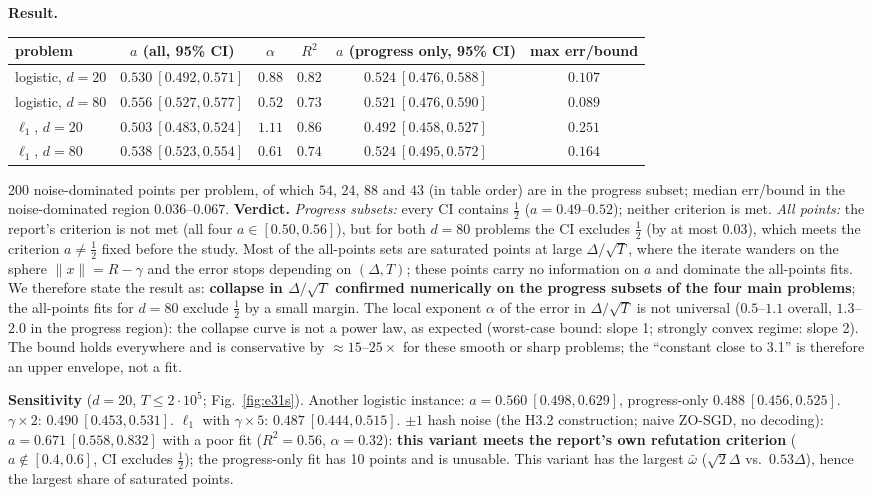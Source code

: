 \documentclass[11pt,a4paper]{article}
\numberwithin{equation}{section}
\theoremstyle{definition}
\theoremstyle{remark}
\newcommand{\norm}[1]{\lVert #1\rVert}\newcommand{\abs}[1]{\lvert #1\rvert}\newcommand{\ip}[2]{\langle #1,#2\rangle}
\newcommand{\wbar}{\bar\omega}\newcommand{\Atwo}{\cA^{\rm 2pt}_\gamma}
\begin{document}
\textbf{Result.}
\begin{center}\small
\begin{tabular}{@{}lccccc@{}}
\toprule
problem & $a$ (all, 95\% CI) & $\alpha$ & $R^2$ & $a$ (progress only, 95\% CI) & max err/bound\\
\midrule
logistic, $d=20$ & $0.530\ [0.492,0.571]$ & $0.88$ & $0.82$ & $0.524\ [0.476,0.588]$ & $0.107$\\
logistic, $d=80$ & $0.556\ [0.527,0.577]$ & $0.52$ & $0.73$ & $0.521\ [0.476,0.590]$ & $0.089$\\
$\ell_1$, $d=20$ & $0.503\ [0.483,0.524]$ & $1.11$ & $0.86$ & $0.492\ [0.458,0.527]$ & $0.251$\\
$\ell_1$, $d=80$ & $0.538\ [0.523,0.554]$ & $0.61$ & $0.74$ & $0.524\ [0.495,0.572]$ & $0.164$\\
\bottomrule
\end{tabular}
\end{center}
200 noise-dominated points per problem, of which $54$, $24$, $88$ and $43$ (in table order) are in the progress subset; median err/bound in the noise-dominated region $0.036$--$0.067$. \textbf{Verdict.} \emph{Progress subsets:} every CI contains $\frac12$ ($a=0.49$--$0.52$); neither criterion is met. \emph{All points:} the report's criterion is not met (all four $a\in[0.50,0.56]$), but for both $d=80$ problems the CI excludes $\frac12$ (by at most $0.03$), which meets the criterion $a\ne\frac12$ fixed before the study. Most of the all-points sets are saturated points at large $\Delta/\sqrt T$, where the iterate wanders on the sphere $\norm x=R-\gamma$ and the error stops depending on $(\Delta,T)$; these points carry no information on $a$ and dominate the all-points fits. We therefore state the result as: \textbf{collapse in $\Delta/\sqrt T$ confirmed numerically on the progress subsets of the four main problems}; the all-points fits for $d=80$ exclude $\frac12$ by a small margin. The local exponent $\alpha$ of the error in $\Delta/\sqrt T$ is not universal ($0.5$--$1.1$ overall, $1.3$--$2.0$ in the progress region): the collapse curve is not a power law, as expected (worst-case bound: slope 1; strongly convex regime: slope 2). The bound holds everywhere and is conservative by $\approx15$--$25\times$ for these smooth or sharp problems; the ``constant close to 3.1'' is therefore an upper envelope, not a fit.

\textbf{Sensitivity} ($d=20$, $T\le2\cdot10^5$; Fig.~\ref{fig:e31s}). Another logistic instance: $a=0.560\ [0.498,0.629]$, progress-only $0.488\ [0.456,0.525]$. $\gamma\times2$: $0.490\ [0.453,0.531]$. $\ell_1$ with $\gamma\times5$: $0.487\ [0.444,0.515]$. $\pm1$ hash noise (the H3.2 construction; naive ZO-SGD, no decoding): $a=0.671\ [0.558,0.832]$ with a poor fit ($R^2=0.56$, $\alpha=0.32$): \textbf{this variant meets the report's own refutation criterion} ($a\notin[0.4,0.6]$, CI excludes $\frac12$); the progress-only fit has 10 points and is unusable. This variant has the largest $\wbar$ ($\sqrt2\Delta$ vs.\ $0.53\Delta$), hence the largest share of saturated points.
\end{document}
